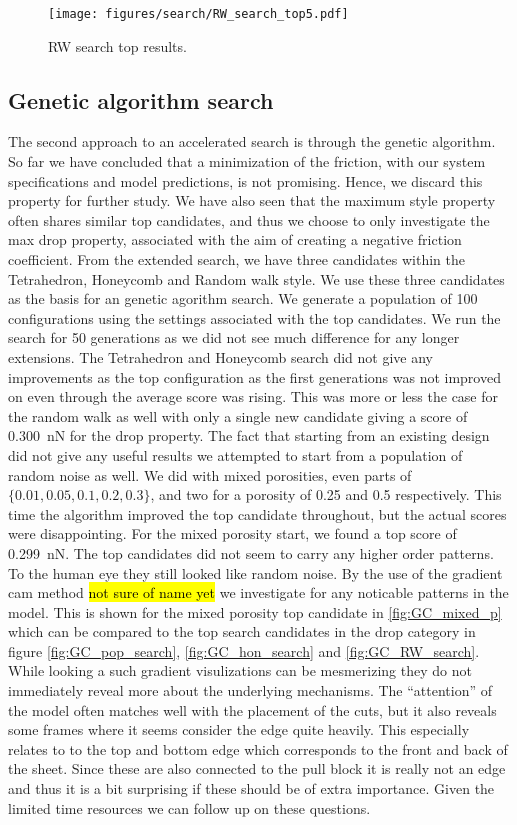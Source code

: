 \begin{figure}[H]
  \centering
  \texttt{[image: figures/search/RW\_search\_top5.pdf]}
  \caption{RW search top results.}
  \label{fig:RW_search_top5}
\end{figure}  



\subsection{Genetic algorithm search}
The second approach to an accelerated search is through the genetic algorithm.
So far we have concluded that a minimization of the friction, with our system
specifications and model predictions, is not promising. Hence, we discard this
property for further study. We have also seen that the maximum style property
often shares similar top candidates, and thus we choose to only investigate the
max drop property, associated with the aim of creating a negative friction
coefficient. From the extended search, we have three candidates within the
Tetrahedron, Honeycomb and Random walk style. We use these three candidates as
the basis for an genetic agorithm search. We generate a population of 100
configurations using the settings associated with the top candidates. We run the
search for 50 generations as we did not see much difference for any longer
extensions. The Tetrahedron and Honeycomb search did not give any improvements
as the top configuration as the first generations was not improved on even
through the average score was rising. This was more or less the case for the
random walk as well with only a single new candidate giving a score of
\SI{0.300}{nN} for the drop property. The fact that starting from an existing
design did not give any useful results we attempted to start from a population
of random noise as well. We did with mixed porosities, even parts of $\{0.01,
0.05, 0.1, 0.2, 0.3\}$, and two for a porosity of 0.25 and 0.5 respectively.
This time the algorithm improved the top candidate throughout, but the actual
scores were disappointing. For the mixed porosity start, we found a top score of
\SI{0.299}{nN}. The top candidates did not seem to carry any higher order
patterns. To the human eye they still looked like random noise. By the use of
the gradient cam method \hl{not sure of name yet} we investigate for any
noticable patterns in the model. This is shown for the mixed porosity top
candidate in \cref{fig:GC_mixed_p} which can be compared to the top search
candidates in the drop category in figure \cref{fig:GC_pop_search}, \cref{fig:GC_hon_search} and \cref{fig:GC_RW_search}. While looking a such gradient visulizations can be mesmerizing they do not immediately reveal more about the underlying mechanisms. The ``attention'' of the model often matches well with the placement of the cuts, but it also reveals some frames where it seems consider the edge quite heavily. This especially relates to to the top and bottom edge which corresponds to the front and back of the sheet. Since these are also connected to the pull block it is really not an edge and thus it is a bit surprising if these should be of extra importance. Given the limited time resources we can follow up on these questions.



